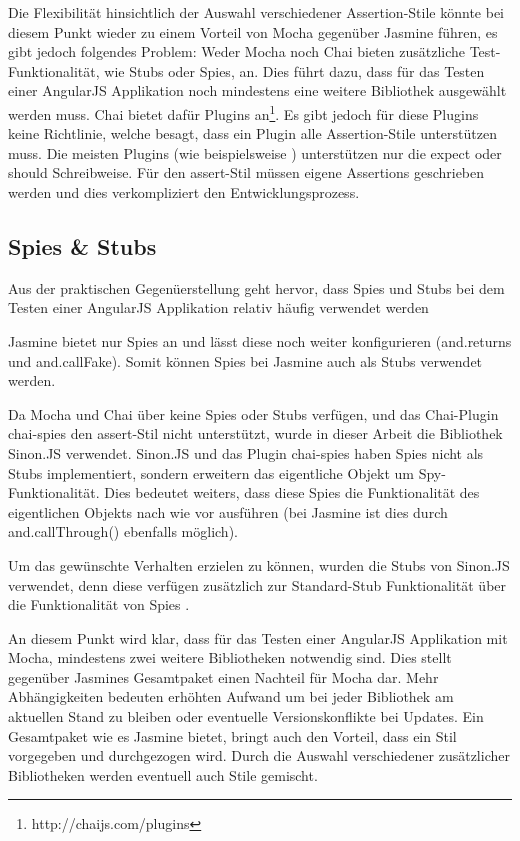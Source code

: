 Die Flexibilität hinsichtlich der Auswahl verschiedener Assertion-Stile könnte bei diesem Punkt wieder zu einem Vorteil von Mocha gegenüber Jasmine führen, es gibt jedoch folgendes Problem: Weder Mocha noch Chai bieten zusätzliche Test-Funktionalität, wie Stubs oder Spies, an. Dies führt dazu, dass für das Testen einer AngularJS Applikation noch mindestens eine weitere Bibliothek ausgewählt werden muss. Chai bietet dafür Plugins an\footnote{http://chaijs.com/plugins}. Es gibt jedoch für diese Plugins keine Richtlinie, welche besagt, dass ein Plugin alle Assertion-Stile unterstützen muss. Die meisten Plugins (wie beispielsweise ) unterstützen nur die expect oder should Schreibweise. Für den assert-Stil müssen eigene Assertions geschrieben werden und dies verkompliziert den Entwicklungsprozess.

\subsection{Spies \& Stubs}
Aus der praktischen Gegenüerstellung geht hervor, dass Spies und Stubs bei dem Testen einer AngularJS Applikation relativ häufig verwendet werden
 
Jasmine bietet nur Spies an und lässt diese noch weiter konfigurieren (and.returns und and.callFake). Somit können Spies bei Jasmine auch als Stubs verwendet werden.

Da Mocha und Chai über keine Spies oder Stubs verfügen, und das Chai-Plugin chai-spies den assert-Stil nicht unterstützt, wurde in dieser Arbeit die Bibliothek Sinon.JS verwendet. Sinon.JS und das Plugin chai-spies haben Spies nicht als Stubs implementiert, sondern erweitern das eigentliche Objekt um Spy-Funktionalität. Dies bedeutet weiters, dass diese Spies die Funktionalität des eigentlichen Objekts nach wie vor ausführen (bei Jasmine ist dies durch and.callThrough() ebenfalls möglich).

Um das gewünschte Verhalten erzielen zu können, wurden die Stubs von Sinon.JS verwendet, denn diese verfügen zusätzlich zur Standard-Stub Funktionalität über die Funktionalität von Spies \autocite{Sinon:Documentation}.

An diesem Punkt wird klar, dass für das Testen einer AngularJS Applikation mit Mocha, mindestens zwei weitere Bibliotheken notwendig sind. Dies stellt gegenüber Jasmines Gesamtpaket einen Nachteil für Mocha dar. Mehr Abhängigkeiten bedeuten erhöhten Aufwand um bei jeder Bibliothek am aktuellen Stand zu bleiben oder eventuelle Versionskonflikte bei Updates. Ein Gesamtpaket wie es Jasmine bietet, bringt auch den Vorteil, dass ein Stil vorgegeben und durchgezogen wird. Durch die Auswahl verschiedener zusätzlicher Bibliotheken werden eventuell auch Stile gemischt.

